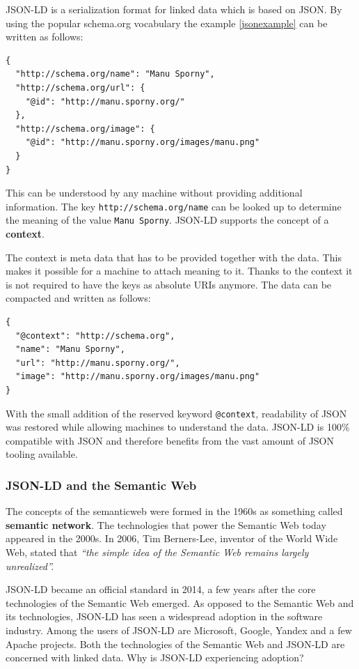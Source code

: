 JSON-LD is a serialization format for linked data which is based on JSON. By using the popular schema.org vocabulary the example \ref{jsonexample} can be written as follows:

\lstset{language=JSON}
\begin{lstlisting}[caption=Data of a person in the JSON-LD format, label=jsonldexample]
{
  "http://schema.org/name": "Manu Sporny",
  "http://schema.org/url": {
    "@id": "http://manu.sporny.org/"
  },
  "http://schema.org/image": {
    "@id": "http://manu.sporny.org/images/manu.png"
  }
}
\end{lstlisting}

This can be understood by any machine without providing additional information. The key \lstinline{http://schema.org/name} can be looked up to determine the meaning of the value \lstinline{Manu Sporny}. JSON-LD supports the concept of a \textbf{context}.

The context is meta data that has to be provided together with the data. This makes it possible for a machine to attach meaning to it. Thanks to the context it is not required to have the keys as absolute URIs anymore. The data can be compacted and written as follows:

\lstset{language=JSON}
\begin{lstlisting}[caption=Compacted data of a person, label=jsonldcompacted]
{
  "@context": "http://schema.org",
  "name": "Manu Sporny",
  "url": "http://manu.sporny.org/",
  "image": "http://manu.sporny.org/images/manu.png"
}
\end{lstlisting}

With the small addition of the reserved keyword \lstinline{@context}, readability of JSON was restored while allowing machines to understand the data. JSON-LD is 100\% compatible with JSON and therefore benefits from the vast amount of JSON tooling available.


\subsubsection{JSON-LD and the Semantic Web}
The concepts of the \gls{semanticweb} were formed in the 1960s as something called \textbf{semantic network}. The technologies that power the Semantic Web today appeared in the 2000s. In 2006, Tim Berners-Lee, inventor of the World Wide Web, stated that \textit{``the simple idea of the Semantic Web remains largely unrealized''.} \citep{semanticwebrevisited}

JSON-LD became an official standard in 2014, a few years after the core technologies of the Semantic Web emerged. As opposed to the Semantic Web and its technologies, JSON-LD has seen a widespread adoption in the software industry. Among the users of JSON-LD are Microsoft, Google, Yandex and a few Apache projects. \citep{jsonldusers} Both the technologies of the Semantic Web and JSON-LD are concerned with linked data. Why is JSON-LD experiencing adoption?

